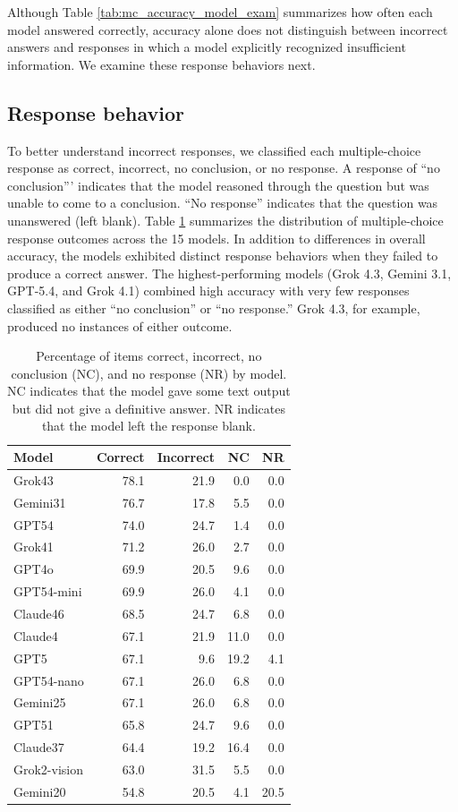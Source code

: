 \documentclass[APA,LATO2COL]{WileyNJDv5}
\begin{document}
Although Table \ref{tab:mc_accuracy_model_exam} summarizes how often each model answered correctly, accuracy alone does not distinguish between incorrect answers and responses in which a model explicitly recognized insufficient information. We examine these response behaviors next.

\subsection{Response behavior}\label{sec:behavior}

To better understand incorrect responses, we classified each multiple-choice response as correct, incorrect, no conclusion, or no response. A response of ``no conclusion''' indicates that the model reasoned through the question but was unable to come to a conclusion. ``No response'' indicates that the question was unanswered (left blank). Table \ref{tab:response_behavior} summarizes the distribution of multiple-choice response outcomes across the 15 models. In addition to differences in overall accuracy, the models exhibited distinct response behaviors when they failed to produce a correct answer. The highest-performing models (Grok 4.3, Gemini 3.1, GPT-5.4, and Grok 4.1) combined high accuracy with very few responses classified as either ``no conclusion'' or ``no response.'' Grok 4.3, for example, produced no instances of either outcome.


\begin{table}[!h]
\centering
\caption{\label{tab:response_behavior}Percentage of items correct, incorrect, no conclusion (NC), and no response (NR) by model. NC indicates that the model gave some text output but did not give a definitive answer. NR indicates that the model left the response blank.}
\centering
\begin{tabular}[t]{lrrrr}
\toprule
Model & Correct & Incorrect  & NC & NR\\
\midrule
Grok43 & 78.1 & 21.9 & 0.0 & 0.0\\
Gemini31 & 76.7 & 17.8 & 5.5 & 0.0\\
GPT54 & 74.0 & 24.7 & 1.4 & 0.0\\
Grok41 & 71.2 & 26.0 & 2.7 & 0.0\\
GPT4o & 69.9 & 20.5 & 9.6 & 0.0\\
\addlinespace
GPT54-mini & 69.9 & 26.0 & 4.1 & 0.0\\
Claude46 & 68.5 & 24.7 & 6.8 & 0.0\\
Claude4 & 67.1 & 21.9 & 11.0 & 0.0\\
GPT5 & 67.1 & 9.6 & 19.2 & 4.1\\
GPT54-nano & 67.1 & 26.0 & 6.8 & 0.0\\
\addlinespace
Gemini25 & 67.1 & 26.0 & 6.8 & 0.0\\
GPT51 & 65.8 & 24.7 & 9.6 & 0.0\\
Claude37 & 64.4 & 19.2 & 16.4 & 0.0\\
Grok2-vision & 63.0 & 31.5 & 5.5 & 0.0\\
Gemini20 & 54.8 & 20.5 & 4.1 & 20.5\\
\bottomrule
\end{tabular}
\end{table}
\end{document}
